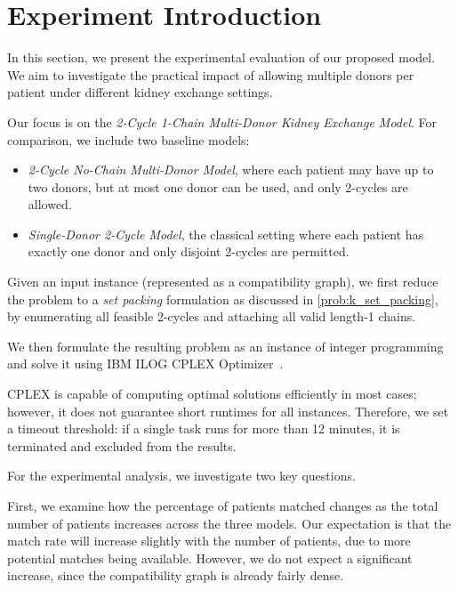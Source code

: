 \section{Experiment Introduction}

In this section, we present the experimental evaluation of our proposed model. We aim to investigate the practical impact of allowing multiple donors per patient under different kidney exchange settings.

Our focus is on the \textit{2-Cycle 1-Chain Multi-Donor Kidney Exchange Model}. For comparison, we include two baseline models:
\begin{itemize}
\item \textit{2-Cycle No-Chain Multi-Donor Model}, where each patient may have up to two donors, but at most one donor can be used, and only 2-cycles are allowed.
\item \textit{Single-Donor 2-Cycle Model}, the classical setting where each patient has exactly one donor and only disjoint 2-cycles are permitted.
\end{itemize}

Given an input instance (represented as a compatibility graph), we first reduce the problem to a \emph{set packing} formulation as discussed in \autoref{prob:k_set_packing}, by enumerating all feasible 2-cycles and attaching all valid length-1 chains.

We then formulate the resulting problem as an instance of integer programming and solve it using IBM ILOG CPLEX Optimizer~\cite{cplex}.

CPLEX is capable of computing optimal solutions efficiently in most cases; however, it does not guarantee short runtimes for all instances. Therefore, we set a timeout threshold: if a single task runs for more than 12 minutes, it is terminated and excluded from the results.


For the experimental analysis, we investigate two key questions.

First, we examine how the percentage of patients matched changes as the total number of patients increases across the three models. Our expectation is that the match rate will increase slightly with the number of patients, due to more potential matches being available. However, we do not expect a significant increase, since the compatibility graph is already fairly dense. 

